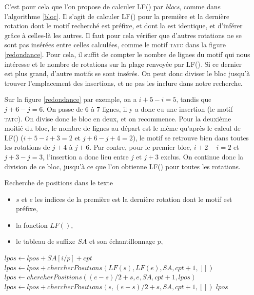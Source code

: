 C'est pour cela que l'on propose de calculer LF() par \textit{blocs}, comme dans l'algorithme \ref{bloc}. Il s'agit de calculer LF() pour la première et la dernière rotation dont le motif recherché est préfixe, et dont la \kbwt{} est identique, et d'inférer grâce à celles-là les autres. Il faut pour cela vérifier que d'autres rotations ne se sont pas insérées entre celles calculées, comme le motif \textsc{tatc} dans la figure \ref{redondance}. Pour cela, il suffit de compter le nombre de lignes du motif qui nous intéresse et le nombre de rotations sur la plage renvoyée par LF(). Si ce dernier est plus grand, d'autre motifs se sont insérés. On peut donc diviser le bloc jusqu'à trouver l'emplacement des insertions, et ne pas les inclure dans notre recherche.

Sur la figure \ref{redondance} par exemple, on a $i+5 - i = 5$, tandis que $j+6 - j = 6$. On passe de 6 à 7 lignes, il y a donc eu une insertion (le motif \textsc{tatc}). On divise donc le bloc en deux, et on recommence. Pour la deuxième moitié du bloc, le nombre de lignes au départ est le même qu'après le calcul de LF() ($i+5 - i+3 = 2$ et $j+6 - j+4 = 2$), le motif se retrouve bien dans toutes les rotations de $j+4$ à $j+6$. Par contre, pour le premier bloc, $i+2 - i = 2$ et $j+3 - j = 3$, l'insertion a donc lieu entre $j$ et $j+3$ exclus. On continue donc la division de ce bloc, jusqu'à ce que l'on obtienne LF() pour toutes les rotations.


\begin{algorithm}
\caption{Recherche de positions dans le texte}	
\label{bloc}	
	\begin{algorithmic}
	\REQUIRE 
		\begin{itemize}
			\item $s$ et $e$ les indices de la première est la dernière rotation dont le motif est préfixe, 
			\item la fonction $LF()$, 
			\item le tableau de suffixe $SA$ et son échantillonnage $p$, 
		\end{itemize}

		\STATE $lpos \gets lpos + SA[i/p] + cpt$
	\ENDFOR
		\STATE $lpos \gets lpos + chercherPositions(LF(s), LF(e), SA, cpt+1, [])$
	\ELSE
		\STATE $lpos \gets chercherPositions((e-s)/2 +s, e, SA, cpt+1, lpos)$
		\STATE $lpos \gets lpos + chercherPositions(s, (e-s)/2 +s, SA, cpt+1, [])$
	\ENDIF
	\RETURN $lpos$
	\end{algorithmic}
\end{algorithm}



